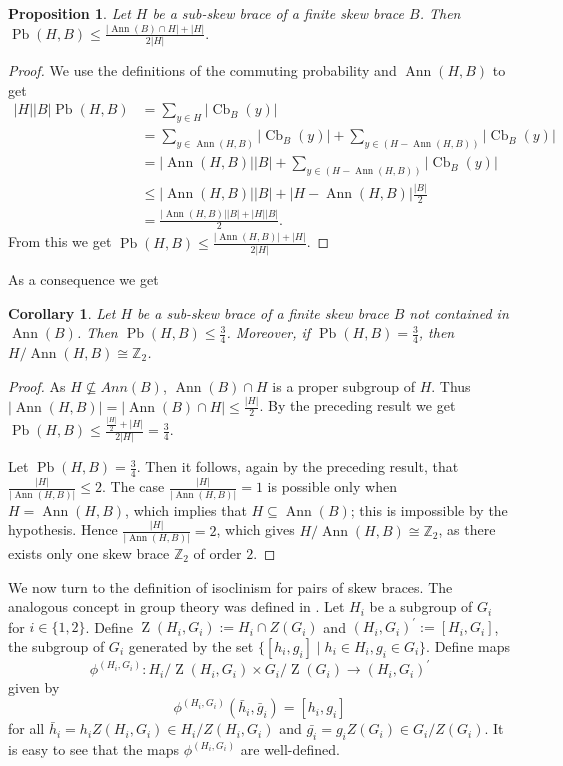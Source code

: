 \documentclass[11pt, oneside]{amsart}
\numberwithin{equation}{section}
\theoremstyle{plain}
\newtheorem{cor}[equation]{Corollary}
\newtheorem{pro}[equation]{Proposition}
\theoremstyle{definition}
\newcommand{\Z}{\operatorname{Z} }
\newcommand{\Cb}{\operatorname{Cb} }
\newcommand{\Pb}{\operatorname{Pb} }
\newcommand{\Ann}{\operatorname{Ann} }
\begin{document}
\begin{pro} %
Let $H$ be a sub-skew brace of a finite skew brace $B$. Then    $\Pb (H,B)\leqslant \frac{|\Ann(B) \cap H|+|H|}{2|H|}.$
\end{pro}
\begin{proof}
 We use the definitions of the commuting probability and $\Ann(H, B)$ to get 
      \begin{align*}
            {|H||B|}\Pb(H,B)&=\sum_{y\in H}|\Cb_{B}(y)|\\
                             &=\sum_{y\in \Ann(H,B)}|\Cb_{B}(y)|+\sum_{y\in (H- \Ann(H,B))}|\Cb_{B}(y)| \\
                             &=|\Ann(H,B)||B|+\sum_{y\in (H-\Ann(H,B))}|\Cb_{B}(y)| \\
                             &\leqslant |\Ann(H,B)||B|+|H-\Ann(H,B)|\frac{|B|}{2}\\
                             & =\frac{|\Ann(H,B)||B|+|H||B|}{2}.
      \end{align*}
  From this we get $\Pb(H,B)\leqslant \frac{|\Ann(H,B)|+|H|}{2|H|}$.
\end{proof}

As a consequence we get
\begin{cor}
   Let $H$ be a sub-skew brace of a finite skew brace $B$ not contained in $\Ann(B)$. Then  $\Pb (H,B)\leqslant \frac{3}{4}$. Moreover, if $\Pb (H,B)= \frac{3}{4}$, then $H/{\Ann(H,B)}\cong \mathbb{Z}_2$.
\end{cor}
\begin{proof}
    As $H\nsubseteq Ann(B)$, $\Ann(B)\cap H$ is a proper subgroup of $H$. Thus $|\Ann(H, B)| = |\Ann(B)\cap H| \leqslant \frac{|H|}{2}$. By the preceding result we get  $\Pb (H,B)\leqslant \frac{\frac{|H|}{2}+|H|}{2|H|}=\frac{3}{4}$.

    Let   $\Pb(H,B) = \frac{3}{4}$. Then  it follows, again by the preceding result, that $\frac{|H|}{|\Ann(H,B)|} \leqslant 2$. The case $\frac{|H|}{|\Ann(H,B)|} = 1$ is possible only when $H = \Ann(H, B)$, which implies that $H \subseteq \Ann(B)$; this is impossible by the hypothesis.   Hence 
      $\frac{|H|}{|\Ann(H,B)|}=2$, which gives $H/{\Ann(H,B)}\cong \mathbb{Z}_2$, as there exists only one skew brace $\mathbb{Z}_2$ of order $2$.
\end{proof}

We now turn to the definition of isoclinism for pairs of skew braces. The analogous concept in group theory was defined in \cite{ERR13}. Let $H_i$ be a subgroup of $G_i$ for $i\in\{1,2\}$.  Define $\Z{(H_i,G_i)}:=H_i\cap Z(G_i)$ and $(H_i,G_i)^\prime := [H_i,G_i]$, the subgroup of $G_i$ generated by the set $\{[h_i, g_i] \mid h_i\in H_i,g_i\in G_i\}$. Define maps  
$${\phi^{(H_i,G_i)}} : H_i/\Z{(H_i,G_i)} \times G_i/\Z(G_i) \to  (H_i,G_i)^\prime$$
given by
$${\phi^{(H_i,G_i)}}(\bar{h}_i,\bar{g}_i)= [h_i,g_i]$$
for all $\bar{h}_i=h_iZ{(H_i,G_i)}\in {H_i/Z{(H_i,G_i)}}$ and  $\bar{g_i}=g_iZ{(G_i)}\in {G_i/Z{(G_i)}}$. It is easy to see that the maps $\phi^{(H_i,G_i)}$ are well-defined.
\end{document}
